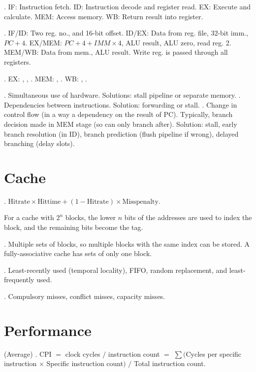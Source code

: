 \documentclass{slnotes}
\begin{document}
. IF: Instruction fetch. ID: Instruction decode and register read. EX: Execute and calculate. MEM: Access memory. WB: Return result into register.

. IF/ID: Two reg. no., and 16-bit offset. ID/EX: Data from reg. file, 32-bit imm., \(PC + 4\). EX/MEM: \(PC + 4 + IMM \times 4\), ALU result, ALU zero, read reg. 2. MEM/WB: Data from mem., ALU result. Write reg. is passed through all registers.

. EX: , , . MEM: , . WB: , .

. Simultaneous use of hardware. Solutions: stall pipeline or separate memory. . Dependencies between instructions. Solution: forwarding or stall. . Change in control flow (in a way a dependency on the result of PC). Typically, branch decision made in MEM stage (so can only branch after). Solution: stall, early branch resolution (in ID), branch prediction (flush pipeline if wrong), delayed branching (delay slots).

\chapter{Cache}
. \(\mathrm{Hit rate} \times \mathrm{Hit time} + (1 - \mathrm{Hit rate}) \times \mathrm{Miss penalty}\).

For a cache with \(2^n\) blocks, the lower \(n\) bits of the addresses are used to index the block, and the remaining bits become the tag.

. Multiple sets of blocks, so multiple blocks with the same index can be stored. A fully-associative cache has sets of only one block.

. Least-recently used (temporal locality), FIFO, random replacement, and least-frequently used.

. Compulsory misses, conflict misses, capacity misses.

\chapter{Performance}
(Average) . CPI \(=\) clock cycles \(/\) instruction count \(=\) \(\sum (\)Cycles per specific instruction \(\times\) Specific instruction count\()\) \(/\) Total instruction count.
\end{document}
